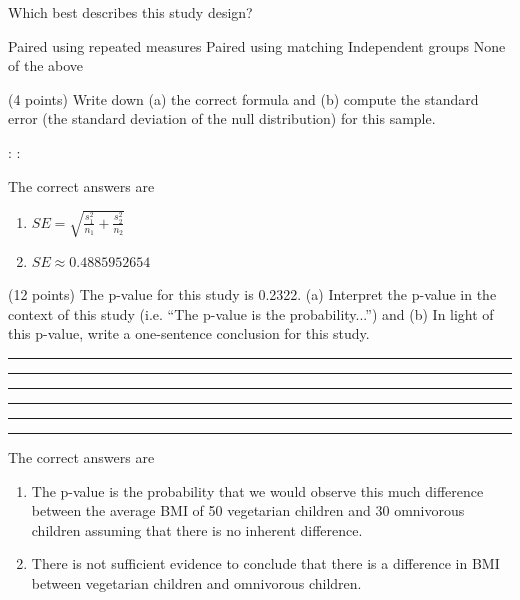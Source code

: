 \documentclass{article}
\begin{document}
\begin{mcquestions}
		\question Which best describes this study design? \label{veg1}
		\begin{mcanswerslist}
			\answer Paired using repeated measures
			\answer Paired using matching
			\answer[correct] Independent groups
			\answer None of the above
		\end{mcanswerslist}
		
		\question[follow] (4 points) Write down (a) the correct formula and (b) compute the standard error (the standard deviation of the null distribution) for this sample. \label{veg2}
		\begin{mcanswerslist}[permutenone]
			\answer : \vspace{.25 in}
			\answer :
		\end{mcanswerslist}
		\begin{mcexplanation}
			The correct answers are
			\begin{enumerate}[label=(\alph*)]
				\item \(SE = \sqrt{\frac{s_1^2}{n_1} + \frac{s_2^2}{n_2}}\)
				\item \(SE \approx 0.4885952654\)
			\end{enumerate}
		\end{mcexplanation}
		
		\question[follow] (12 points) The p-value for this study is 0.2322.  (a) Interpret the p-value in the context of this study (i.e. ``The p-value is the probability...'') and (b) In light of this p-value, write a one-sentence conclusion for this study. \label{veg3}
		\begin{mcanswerslist}[permutenone]
			\answer \rule{\textwidth}{.5pt}
			\rule{\textwidth}{.5pt}
			\rule{\textwidth}{.5pt}
			\vspace{.1 in}
			\answer \rule{\textwidth}{.5pt}
			\rule{\textwidth}{.5pt}
			\rule{\textwidth}{.5pt}
		\end{mcanswerslist}
		\begin{mcexplanation}
		The correct answers are
		\begin{enumerate}[label=(\alph*)]
			\item The p-value is the probability that we would observe this much difference between the average BMI of 50 vegetarian children and 30 omnivorous children assuming that there is no inherent difference.
			\item There is not sufficient evidence to conclude that there is a difference in BMI between vegetarian children and omnivorous children.
		\end{enumerate}
		\end{mcexplanation}
		

\end{mcquestions}
\end{document}
